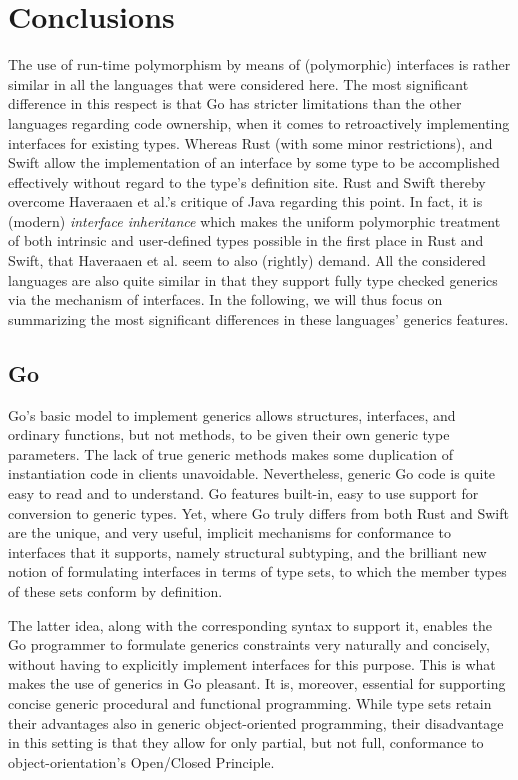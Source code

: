\documentclass[11pt,oneside]{report}
\begin{document}
\section{Conclusions}

The use of run-time polymorphism by means of (polymorphic) interfaces
is rather similar in all the languages that were considered here. The
most significant difference in this respect is that Go has stricter
limitations than the other languages regarding code ownership, when it
comes to retroactively implementing interfaces for existing
types. Whereas Rust (with some minor restrictions), and Swift allow
the implementation of an interface by some type to be accomplished
effectively without regard to the type's definition site. Rust and
Swift thereby overcome Haveraaen et al.'s critique
\cite{Haveraaen_et_al_19} of Java regarding this point. In fact, it is
(modern) \emph{interface inheritance} which makes the uniform
polymorphic treatment of both intrinsic and user-defined types
possible in the first place in Rust and Swift, that Haveraaen et
al. seem to also (rightly) demand. All the considered languages are
also quite similar in that they support fully type checked generics
via the mechanism of interfaces. In the following, we will thus focus
on summarizing the most significant differences in these languages'
generics features.

\subsection{Go}

Go's basic model to implement generics allows structures, interfaces,
and ordinary functions, but not methods, to be given their own generic
type parameters. The lack of true generic methods makes some
duplication of instantiation code in clients
unavoidable. Nevertheless, generic Go code is quite easy to read and
to understand. Go features built-in, easy to use support for
conversion to generic types. Yet, where Go truly differs from both
Rust and Swift are the unique, and very useful, implicit
mechanisms for conformance to interfaces that it supports, namely
structural subtyping, and the brilliant new notion of formulating
interfaces in terms of type sets, to which the member types of these
sets conform by definition.

The latter idea, along with the corresponding syntax to support it,
enables the Go programmer to formulate generics constraints very
naturally and concisely, without having to explicitly implement
interfaces for this purpose. This is what makes the use of generics in
Go pleasant. It is, moreover, essential for supporting concise generic
procedural and functional programming. While type sets retain their
advantages also in generic object-oriented programming, their
disadvantage in this setting is that they allow for only partial, but
not full, conformance to object-orientation's Open/Closed Principle.
\end{document}
